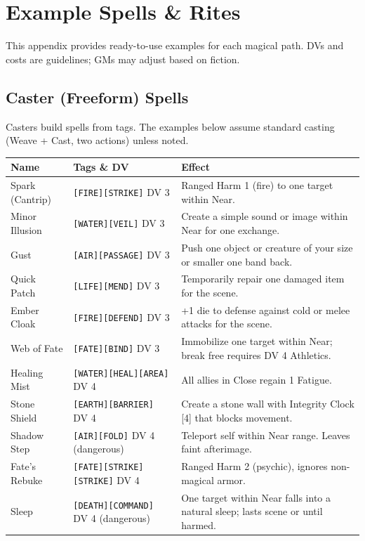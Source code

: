 
\section{Example Spells \& Rites}

This appendix provides ready-to-use examples for each magical path. DVs and costs are guidelines; GMs may adjust based on fiction.

\subsection{Caster (Freeform) Spells}

Casters build spells from tags. The examples below assume standard casting (Weave + Cast, two actions) unless noted.

\begin{tabular}{@{}l>{\raggedright\arraybackslash}p{3cm}>{\raggedright\arraybackslash}p{7cm}@{}}
\toprule
\textbf{Name} & \textbf{Tags \& DV} & \textbf{Effect} \\
\midrule
Spark (Cantrip) & \texttt{[FIRE][STRIKE]} DV 3 & Ranged Harm 1 (fire) to one target within Near. \\
Minor Illusion & \texttt{[WATER][VEIL]} DV 3 & Create a simple sound or image within Near for one exchange. \\
Gust & \texttt{[AIR][PASSAGE]} DV 3 & Push one object or creature of your size or smaller one band back. \\
Quick Patch & \texttt{[LIFE][MEND]} DV 3 & Temporarily repair one damaged item for the scene. \\
Ember Cloak & \texttt{[FIRE][DEFEND]} DV 3 & +1 die to defense against cold or melee attacks for the scene. \\
Web of Fate & \texttt{[FATE][BIND]} DV 3 & Immobilize one target within Near; break free requires DV 4 Athletics. \\
Healing Mist & \texttt{[WATER][HEAL][AREA]} DV 4 & All allies in Close regain 1 Fatigue. \\
Stone Shield & \texttt{[EARTH][BARRIER]} DV 4 & Create a stone wall with Integrity Clock [4] that blocks movement. \\
Shadow Step & \texttt{[AIR][FOLD]} DV 4 (dangerous) & Teleport self within Near range. Leaves faint afterimage. \\
Fate's Rebuke & \texttt{[FATE][STRIKE][STRIKE]} DV 4 & Ranged Harm 2 (psychic), ignores non-magical armor. \\
Sleep & \texttt{[DEATH][COMMAND]} DV 4 (dangerous) & One target within Near falls into a natural sleep; lasts scene or until harmed. \\
\bottomrule
\end{tabular}

